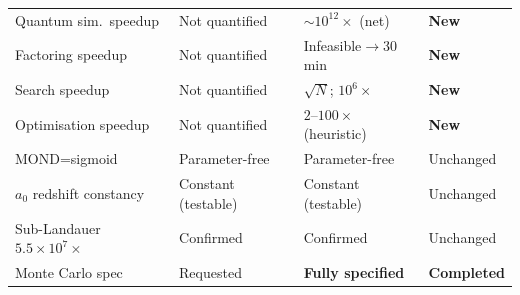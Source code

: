 \documentclass[11pt]{article}
\theoremstyle{definition}
\theoremstyle{remark}
\newcommand{\ee}[1]{\times 10^{#1}}
\begin{document}
\begin{center}
\begin{tabular}{@{}p{4.5cm}lll@{}}
Quantum sim.\ speedup & Not quantified & $\sim 10^{12}\times$ (net) &
  \textbf{New} \\
Factoring speedup & Not quantified & Infeasible$\to$30\,min &
  \textbf{New} \\
Search speedup & Not quantified & $\sqrt{N}$; $10^6\times$ &
  \textbf{New} \\
Optimisation speedup & Not quantified & $2$--$100\times$ (heuristic) &
  \textbf{New} \\
MOND=sigmoid & Parameter-free & Parameter-free & Unchanged \\
$a_0$ redshift constancy & Constant (testable) & Constant (testable) &
  Unchanged \\
Sub-Landauer $5.5\ee{7}\times$ & Confirmed & Confirmed & Unchanged \\
Monte Carlo spec & Requested & \textbf{Fully specified} &
  \textbf{Completed} \\
\bottomrule
\end{tabular}
\end{center}
\end{document}
